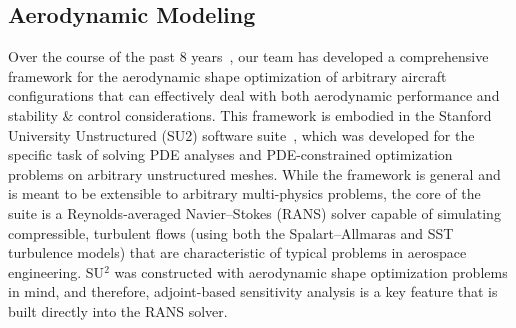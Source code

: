\documentclass[]{aiaa-tc}
\begin{document}


    \subsection{Aerodynamic Modeling}

\noindent Over the course of the past 8 years~\cite{Palacios:Adjoint-Based,Choi:2008qf}, our team has developed a comprehensive framework for the aerodynamic shape optimization of arbitrary aircraft configurations that can effectively deal with both aerodynamic performance and stability \& control considerations.  This framework is embodied in the Stanford University Unstructured (SU2) software suite~\cite{palacios2013}, which was developed for the specific task of solving PDE analyses and PDE-constrained optimization problems on arbitrary unstructured meshes. While the framework is general and is meant to be extensible to arbitrary multi-physics problems, the core of the suite is a Reynolds-averaged Navier--Stokes (RANS) solver capable of simulating compressible, turbulent flows (using both the Spalart--Allmaras and SST turbulence models) that are characteristic of typical problems in aerospace engineering. SU$^2$ was constructed with aerodynamic shape optimization problems in mind, and therefore, adjoint-based sensitivity analysis is a key feature that is built directly into the RANS solver.
\end{document}
